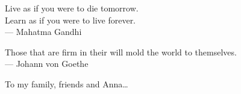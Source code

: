 \cleardoublepage
\thispagestyle{empty}


\vspace*{3cm}

\begin{raggedleft}
Live as if you were to die tomorrow. \\
Learn as if you were to live forever. \\
     --- Mahatma Gandhi\\
\end{raggedleft}

\vspace{8mm}

\begin{raggedleft}
Those that are firm in their will mold the world to themselves. \\
     --- Johann von Goethe\\
\end{raggedleft}

\vspace{4cm}

\begin{center}
    To my family, friends and Anna\dots
\end{center}

\newpage


